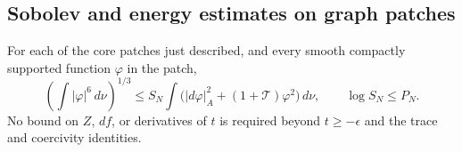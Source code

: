 \subsection{Sobolev and energy estimates on graph patches}

\begin{lemma}
\label{es:sobolev}
For each of the core patches just described, and every smooth
compactly supported function $\varphi$ in the patch,
\begin{equation}\label{es:sobolev-form}
 \left(\int|\varphi|^6\,d\nu\right)^{1/3}
 \le S_N\int\bigl(|d\varphi|_A^2
                     +(1+\mathcal T)\varphi^2\bigr)\,d\nu,
 \qquad \log S_N\le P_N.
\end{equation}
No bound on $Z$, $df$, or derivatives of $t$ is required beyond
$t\ge-\epsilon$ and the trace and coercivity identities.
\end{lemma}

